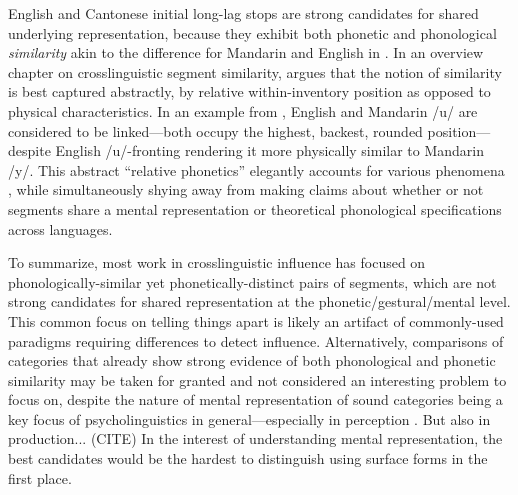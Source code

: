 English and Cantonese initial long-lag stops are strong candidates for shared underlying representation, because they exhibit both phonetic and phonological \textit{similarity} akin to the difference for Mandarin and English in \citep{yang_2019_vot}. In an overview chapter on crosslinguistic segment similarity, \citep{chang_2015_similarity} argues that the notion of similarity is best captured abstractly, by relative within-inventory position as opposed to physical characteristics. In an example from \citep{chang_2015_similarity}, English and Mandarin /u/ are considered to be linked---both occupy the highest, backest, rounded position---despite English /u/-fronting rendering it more physically similar to Mandarin /y/. This abstract ``relative phonetics'' elegantly accounts for various phenomena \citep{chang_2015_similarity}, while simultaneously shying away from making claims about whether or not segments share a mental representation or theoretical phonological specifications across languages. 

To summarize, most work in crosslinguistic influence has focused on phonologically-similar yet phonetically-distinct pairs of segments, which are not strong candidates for shared representation at the phonetic/gestural/mental level. This common focus on telling things apart is likely an artifact of commonly-used paradigms requiring differences to detect influence. Alternatively, comparisons of categories that already show strong evidence of both phonological and phonetic similarity may be taken for granted and not considered an interesting problem to focus on, despite the nature of mental representation of sound categories being a key focus of psycholinguistics in general---especially in perception \citep{samuel_2020_resist}. But also in production... (CITE) In the interest of understanding mental representation, the best candidates would be the hardest to distinguish using surface forms in the first place. 

